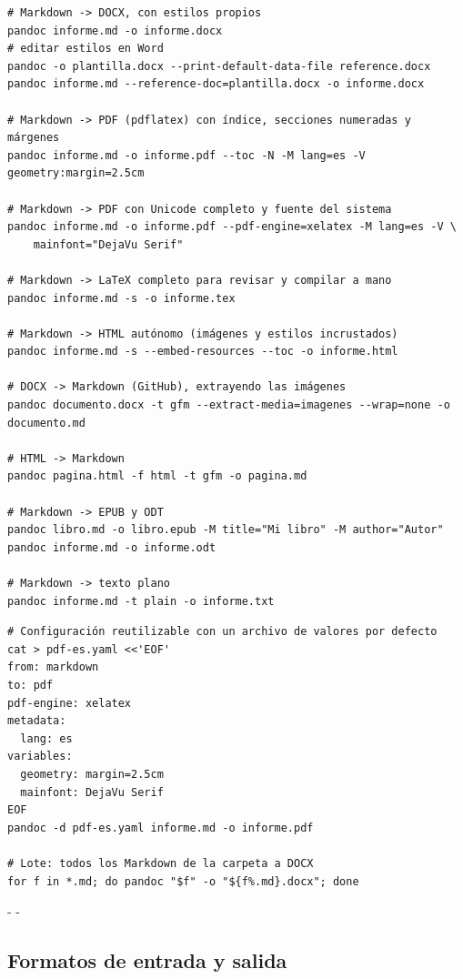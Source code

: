 \documentclass[11pt,a4paper]{article}
\makeatletter
\newcommand{\necesitaespacio}[1]{\par\penalty-100\begingroup
	\setlength{\dimen@}{#1}\dimen@ii\pagegoal\advance\dimen@ii-\pagetotal
	\ifdim\dimen@>\dimen@ii\ifdim\dimen@ii>\z@\vfil\fi\penalty-\@M\fi\endgroup}
\makeatother
\begin{document}
	\begin{lstlisting}
# Markdown -> DOCX, con estilos propios
pandoc informe.md -o informe.docx
# editar estilos en Word
pandoc -o plantilla.docx --print-default-data-file reference.docx
pandoc informe.md --reference-doc=plantilla.docx -o informe.docx

# Markdown -> PDF (pdflatex) con índice, secciones numeradas y márgenes
pandoc informe.md -o informe.pdf --toc -N -M lang=es -V geometry:margin=2.5cm

# Markdown -> PDF con Unicode completo y fuente del sistema
pandoc informe.md -o informe.pdf --pdf-engine=xelatex -M lang=es -V \
    mainfont="DejaVu Serif"

# Markdown -> LaTeX completo para revisar y compilar a mano
pandoc informe.md -s -o informe.tex

# Markdown -> HTML autónomo (imágenes y estilos incrustados)
pandoc informe.md -s --embed-resources --toc -o informe.html

# DOCX -> Markdown (GitHub), extrayendo las imágenes
pandoc documento.docx -t gfm --extract-media=imagenes --wrap=none -o documento.md

# HTML -> Markdown
pandoc pagina.html -f html -t gfm -o pagina.md

# Markdown -> EPUB y ODT
pandoc libro.md -o libro.epub -M title="Mi libro" -M author="Autor"
pandoc informe.md -o informe.odt

# Markdown -> texto plano
pandoc informe.md -t plain -o informe.txt
\end{lstlisting}
	
	\begin{lstlisting}
# Configuración reutilizable con un archivo de valores por defecto
cat > pdf-es.yaml <<'EOF'
from: markdown
to: pdf
pdf-engine: xelatex
metadata:
  lang: es
variables:
  geometry: margin=2.5cm
  mainfont: DejaVu Serif
EOF
pandoc -d pdf-es.yaml informe.md -o informe.pdf

# Lote: todos los Markdown de la carpeta a DOCX
for f in *.md; do pandoc "$f" -o "${f%.md}.docx"; done
\end{lstlisting}
	
	\necesitaespacio{32\baselineskip}
	\subsection{Formatos de entrada y salida}
	
\end{document}

